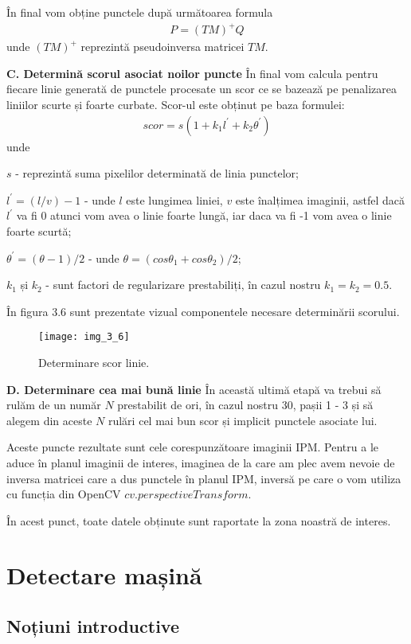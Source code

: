 În final vom obține punctele după următoarea formula
\begin{align}
	P = (TM)^+Q
\end{align}
unde $(TM)^+$ reprezintă pseudoinversa matricei $TM$.

\textbf{C. Determină scorul asociat noilor puncte}
În final vom calcula pentru fiecare linie generată de punctele procesate un scor ce se bazează pe penalizarea liniilor scurte și foarte curbate. Scor-ul este obținut pe baza formulei:
\begin{align}
	scor = s(1 + k_1l^{'}+k_2\theta^{'})
\end{align}
unde

$s$ - reprezintă suma pixelilor determinată de linia punctelor;

$l^{'} = (l/v) - 1$ - unde $l$ este lungimea liniei, $v$ este înalțimea imaginii, astfel dacă $l^{'}$ va fi 0 atunci vom avea o linie foarte lungă, iar daca va fi -1 vom avea o linie foarte scurtă;

$\theta^{'} = (\theta - 1)/2$ - unde $\theta = (cos\theta_1 + cos\theta_2)/2$;

$k_1$ și $k_2$ - sunt factori de regularizare prestabiliți, în cazul nostru $k_1 = k_2 = 0.5$.

În figura 3.6 sunt prezentate vizual componentele necesare determinării scorului.
\begin{figure}[!h]
	\centering
	\texttt{[image: img\_3\_6]}
	\caption{Determinare scor linie.}
\end{figure}

\textbf{D. Determinare cea mai bună linie}
În această ultimă etapă va trebui să rulăm de un număr $N$ prestabilit de ori, în cazul nostru 30, pașii 1 - 3 și să alegem din aceste $N$ rulări cel mai bun scor și implicit punctele asociate lui.

Aceste puncte rezultate sunt cele corespunzătoare imaginii IPM. Pentru a le aduce în planul imaginii de interes, imaginea de la care am plec avem nevoie de inversa matricei care a dus punctele în planul IPM, inversă pe care o vom utiliza cu funcția din OpenCV $cv.perspectiveTransform$. 

În acest punct, toate datele obținute sunt raportate la zona noastră de interes.

\section{Detectare mașină}
\subsection{Noțiuni introductive}

